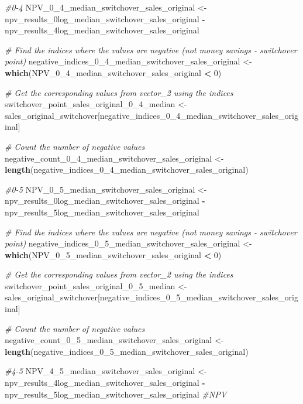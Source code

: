 \documentclass[
]{article}
\newenvironment{Shaded}{\begin{snugshade}}{\end{snugshade}}
\newcommand{\CommentTok}[1]{\textcolor[rgb]{0.56,0.35,0.01}{\textit{#1}}}
\newcommand{\DecValTok}[1]{\textcolor[rgb]{0.00,0.00,0.81}{#1}}
\newcommand{\FunctionTok}[1]{\textcolor[rgb]{0.13,0.29,0.53}{\textbf{#1}}}
\newcommand{\NormalTok}[1]{#1}
\newcommand{\OtherTok}[1]{\textcolor[rgb]{0.56,0.35,0.01}{#1}}
\newcommand{\SpecialCharTok}[1]{\textcolor[rgb]{0.81,0.36,0.00}{\textbf{#1}}}
\begin{document}
\begin{Shaded}
\begin{Highlighting}[]
\CommentTok{\#0{-}4}
\NormalTok{NPV\_0\_4\_median\_switchover\_sales\_original }\OtherTok{\textless{}{-}}\NormalTok{ npv\_results\_0log\_median\_switchover\_sales\_original }\SpecialCharTok{{-}}\NormalTok{ npv\_results\_4log\_median\_switchover\_sales\_original}

\CommentTok{\# Find the indices where the values are negative (not money savings {-} switchover point)}
\NormalTok{negative\_indices\_0\_4\_median\_switchover\_sales\_original }\OtherTok{\textless{}{-}} \FunctionTok{which}\NormalTok{(NPV\_0\_4\_median\_switchover\_sales\_original }\SpecialCharTok{\textless{}} \DecValTok{0}\NormalTok{)}

\CommentTok{\# Get the corresponding values from vector\_2 using the indices}
\NormalTok{switchover\_point\_sales\_original\_0\_4\_median }\OtherTok{\textless{}{-}}\NormalTok{ sales\_original\_switchover[negative\_indices\_0\_4\_median\_switchover\_sales\_original]}

\CommentTok{\# Count the number of negative values}
\NormalTok{negative\_count\_0\_4\_median\_switchover\_sales\_original }\OtherTok{\textless{}{-}} \FunctionTok{length}\NormalTok{(negative\_indices\_0\_4\_median\_switchover\_sales\_original)}


\CommentTok{\#0{-}5}
\NormalTok{NPV\_0\_5\_median\_switchover\_sales\_original }\OtherTok{\textless{}{-}}\NormalTok{ npv\_results\_0log\_median\_switchover\_sales\_original }\SpecialCharTok{{-}}\NormalTok{ npv\_results\_5log\_median\_switchover\_sales\_original}

\CommentTok{\# Find the indices where the values are negative (not money savings {-} switchover point)}
\NormalTok{negative\_indices\_0\_5\_median\_switchover\_sales\_original }\OtherTok{\textless{}{-}} \FunctionTok{which}\NormalTok{(NPV\_0\_5\_median\_switchover\_sales\_original }\SpecialCharTok{\textless{}} \DecValTok{0}\NormalTok{)}

\CommentTok{\# Get the corresponding values from vector\_2 using the indices}
\NormalTok{switchover\_point\_sales\_original\_0\_5\_median }\OtherTok{\textless{}{-}}\NormalTok{ sales\_original\_switchover[negative\_indices\_0\_5\_median\_switchover\_sales\_original]}

\CommentTok{\# Count the number of negative values}
\NormalTok{negative\_count\_0\_5\_median\_switchover\_sales\_original }\OtherTok{\textless{}{-}} \FunctionTok{length}\NormalTok{(negative\_indices\_0\_5\_median\_switchover\_sales\_original)}

\CommentTok{\#4{-}5}
\NormalTok{NPV\_4\_5\_median\_switchover\_sales\_original }\OtherTok{\textless{}{-}}\NormalTok{ npv\_results\_4log\_median\_switchover\_sales\_original }\SpecialCharTok{{-}}\NormalTok{ npv\_results\_5log\_median\_switchover\_sales\_original }\CommentTok{\#NPV}


\end{Highlighting}
\end{Shaded}
\end{document}
